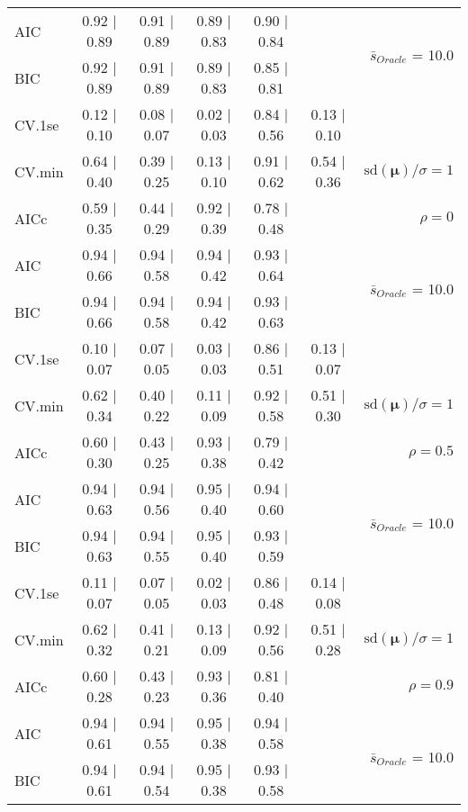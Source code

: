 \begin{table}
\begin{center}
\begin{tabular}{l*{5}{c}|r}
AIC & 0.92 $\mid$ 0.89 & 0.91 $\mid$ 0.89 & 0.89 $\mid$ 0.83 & 0.90 $\mid$ 0.84 & &  \multirow{2}{*}{$\bar{s}_{Oracle}$ = 10.0} \\
BIC & 0.92 $\mid$ 0.89 & 0.91 $\mid$ 0.89 & 0.89 $\mid$ 0.83 & 0.85 $\mid$ 0.81 & &  \\
 \hline 
CV.1se & 0.12 $\mid$ 0.10 & 0.08 $\mid$ 0.07 & 0.02 $\mid$ 0.03 & 0.84 $\mid$ 0.56 & 0.13 $\mid$ 0.10 & \\
CV.min & 0.64 $\mid$ 0.40 & 0.39 $\mid$ 0.25 & 0.13 $\mid$ 0.10 & 0.91 $\mid$ 0.62 & 0.54 $\mid$ 0.36 &  $\mathrm{sd}(\mathbf{\mu})/\sigma=1$ \\
AICc & 0.59 $\mid$ 0.35 & 0.44 $\mid$ 0.29 & 0.92 $\mid$ 0.39 & 0.78 $\mid$ 0.48 & & $\rho=0$ \\
AIC & 0.94 $\mid$ 0.66 & 0.94 $\mid$ 0.58 & 0.94 $\mid$ 0.42 & 0.93 $\mid$ 0.64 & &  \multirow{2}{*}{$\bar{s}_{Oracle}$ = 10.0} \\
BIC & 0.94 $\mid$ 0.66 & 0.94 $\mid$ 0.58 & 0.94 $\mid$ 0.42 & 0.93 $\mid$ 0.63 & &  \\
 \hline 
CV.1se & 0.10 $\mid$ 0.07 & 0.07 $\mid$ 0.05 & 0.03 $\mid$ 0.03 & 0.86 $\mid$ 0.51 & 0.13 $\mid$ 0.07 & \\
CV.min & 0.62 $\mid$ 0.34 & 0.40 $\mid$ 0.22 & 0.11 $\mid$ 0.09 & 0.92 $\mid$ 0.58 & 0.51 $\mid$ 0.30 &  $\mathrm{sd}(\mathbf{\mu})/\sigma=1$ \\
AICc & 0.60 $\mid$ 0.30 & 0.43 $\mid$ 0.25 & 0.93 $\mid$ 0.38 & 0.79 $\mid$ 0.42 & & $\rho=0.5$ \\
AIC & 0.94 $\mid$ 0.63 & 0.94 $\mid$ 0.56 & 0.95 $\mid$ 0.40 & 0.94 $\mid$ 0.60 & &  \multirow{2}{*}{$\bar{s}_{Oracle}$ = 10.0} \\
BIC & 0.94 $\mid$ 0.63 & 0.94 $\mid$ 0.55 & 0.95 $\mid$ 0.40 & 0.93 $\mid$ 0.59 & &  \\
 \hline 
CV.1se & 0.11 $\mid$ 0.07 & 0.07 $\mid$ 0.05 & 0.02 $\mid$ 0.03 & 0.86 $\mid$ 0.48 & 0.14 $\mid$ 0.08 & \\
CV.min & 0.62 $\mid$ 0.32 & 0.41 $\mid$ 0.21 & 0.13 $\mid$ 0.09 & 0.92 $\mid$ 0.56 & 0.51 $\mid$ 0.28 &  $\mathrm{sd}(\mathbf{\mu})/\sigma=1$ \\
AICc & 0.60 $\mid$ 0.28 & 0.43 $\mid$ 0.23 & 0.93 $\mid$ 0.36 & 0.81 $\mid$ 0.40 & & $\rho=0.9$ \\
AIC & 0.94 $\mid$ 0.61 & 0.94 $\mid$ 0.55 & 0.95 $\mid$ 0.38 & 0.94 $\mid$ 0.58 & &  \multirow{2}{*}{$\bar{s}_{Oracle}$ = 10.0} \\
BIC & 0.94 $\mid$ 0.61 & 0.94 $\mid$ 0.54 & 0.95 $\mid$ 0.38 & 0.93 $\mid$ 0.58 & &  \\

\end{tabular}
\end{center}
\end{table}

